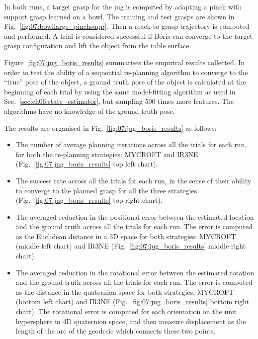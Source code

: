 In both runs, a target grasp for the jug is computed by adapting a pinch with support grasp learned on a bowl. The training and test grasps are shown in Fig.~\ref{fig:07:bowllarge_pinchsupp}. Then a reach-to-grasp trajectory is computed and performed. A trial is considered successful if Boris can converge to the target grasp configuration and lift the object from the table surface. 

Figure~\ref{fig:07:jug_boris_results} summarises the empirical results collected. In order to test the ability of a sequential re-planning algorithm to converge to the ``true'' pose of the object, a ground truth pose of the object is calculated at the beginning of each trial by using the same model-fitting algorithm as used in Sec.~\ref{sec:ch06:state_estimator}, but sampling 500 times more features. The algorithms have no knowledge of the ground truth pose.

The results are organised in Fig.~\ref{fig:07:jug_boris_results} as follows:
\begin{itemize}
\item The number of average planning iterations across all the trials for each run, for both the re-planning strategies: MYCROFT and IR3NE (Fig.~\ref{fig:07:jug_boris_results} top left chart). 

\item The success rate across all the trials for each run, in the sense of their ability to converge to the planned grasp for all the three strategies (Fig.~\ref{fig:07:jug_boris_results} top right chart). 

\item The averaged reduction in the positional error between the estimated location and the ground truth across all the trials for each run. The error is computed as the Euclidean distance in a 3D space for both strategies: MYCROFT (middle left chart) and IR3NE (Fig.~\ref{fig:07:jug_boris_results} middle right chart).

\item The averaged reduction in the rotational error between the estimated rotation and the ground truth across all the trials for each run. The error is computed as the distance in the quaternion space for both strategies: MYCROFT (bottom left chart) and IR3NE (Fig.~\ref{fig:07:jug_boris_results} bottom right chart). The rotational error is computed for each orientation on the unit hypersphere in 4D quaternion space, and then measure displacement as the length of the arc of the geodesic which connects these two points.
\end{itemize}

